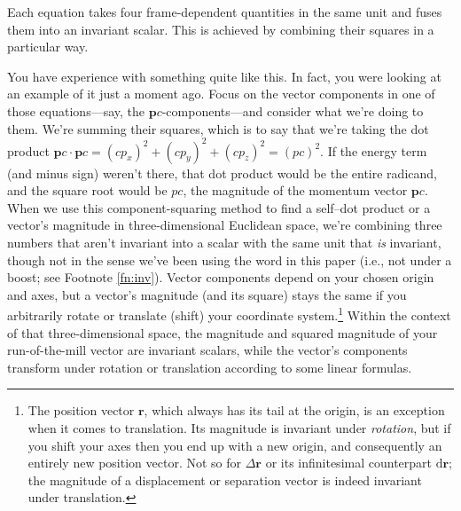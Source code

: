 \documentclass[12pt]{article}
\renewcommand{\vv}[1]{\mathbf{#1}}
\newcommand{\dd}[1]{\mathrm{d}#1}
\begin{document}
Each equation takes four frame-dependent quantities in the same unit and fuses them into an invariant scalar. This is achieved by combining their squares in a particular way.

You have experience with something quite like this. In fact, you were looking at an example of it just a moment ago. Focus on the vector components in one of those equations---say, the $\vv p c$-components---and consider what we're doing to them. We're summing their squares, which is to say that we're taking the dot product $\vv p c \cdot \vv p c= (cp_x)^2 + (cp_y)^2 + (cp_z)^2 = (p c)^2$. If the energy term (and minus sign) weren't there, that dot product would be the entire radicand, and the square root would be $p c$, the magnitude of the momentum vector $\vv p c$. When we use this component-squaring method to find a self--dot product or a vector's magnitude in three-dimensional Euclidean space, we're combining three numbers that aren't invariant into a scalar with the same unit that \emph{is} invariant, though not in the sense we've been using the word in this paper (i.e., not under a boost; see Footnote \ref{fn:inv}). Vector components depend on your chosen origin and axes, but a vector's magnitude (and its square) stays the same if you arbitrarily rotate or translate (shift) your coordinate system.\footnote{\label{fn:pv}The position vector $\vv r$, which always has its tail at the origin, is an exception when it comes to translation. Its magnitude is invariant under \emph{rotation}, but if you shift your axes then you end up with a new origin, and consequently an entirely new position vector. Not so for $\Delta \vv r$ or its infinitesimal counterpart $\dd \vv r$; the magnitude of a displacement or separation vector is indeed invariant under translation.} Within the context of that three-dimensional space, the magnitude and squared magnitude of your run-of-the-mill vector are invariant scalars, while the vector's components transform under rotation or translation according to some linear formulas.
\end{document}

